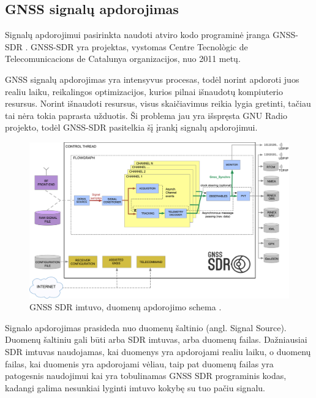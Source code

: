 \documentclass[main.tex]{subfiles}
\begin{document}
\subsection{GNSS signalų apdorojimas}

Signalų apdorojimui pasirinkta naudoti atviro kodo programinė įranga
GNSS-SDR \cite{GNSS-SDR11}. GNSS-SDR yra projektas, vystomas
Centre Tecnològic de Telecomunicacions de Catalunya organizacijos,
nuo 2011 metų.

GNSS signalų apdorojimas yra intensyvus procesas,
todėl norint apdoroti juos realiu laiku, reikalingos optimizacijos,
kurios pilnai išnaudotų kompiuterio resursus. Norint išnaudoti resursus,
visus skaičiavimus reikia lygia gretinti, tačiau tai nėra tokia
paprasta užduotis. Ši problema jau yra išspręsta GNU Radio projekto,
todėl GNSS-SDR pasitelkia šį įrankį signalų apdorojimui.

\begin{figure}[h]
    \begin{centering}
    \includegraphics[scale=12.0]{drawings/GeneralBlockDiagram}
    \par\end{centering}
    \protect\caption{\label{fig:gnss_sdr_block}GNSS SDR imtuvo, duomenų apdorojimo schema \cite{gnss_sdr_web}.}
\end{figure}

Signalo apdorojimas prasideda nuo duomenų šaltinio (angl. Signal Source). Duomenų šaltiniu
gali būti arba SDR imtuvas, arba duomenų failas. Dažniausiai SDR imtuvas naudojamas,
kai duomenys yra apdorojami realiu laiku, o duomenų failas, kai duomenis yra apdorojami
vėliau, taip pat duomenų failas yra patogesnis naudojimui kai yra tobulinamas GNSS SDR
programinis kodas, kadangi galima nesunkiai lyginti imtuvo kokybę su tuo pačiu signalu.
\end{document}
